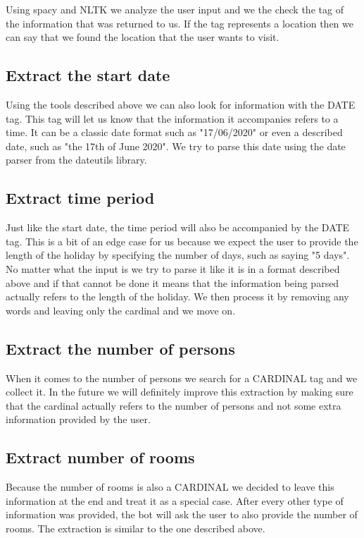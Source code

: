 \documentclass[runningheads,a4paper,11pt]{report}
\begin{document}
Using spacy and NLTK we analyze the user input and we the check the tag of the information that was returned to us. If the tag represents a location then we can say that we found the location that the user wants to visit.

\subsection{Extract the start date}
Using the tools described above we can also look for information with the DATE tag. This tag will let us know that the information it accompanies refers to a time. It can be a classic date format such as "17/06/2020" or even a described date, such as "the 17th of June 2020". We try to parse this date using the date parser from the dateutils library.

\subsection{Extract time period}
Just like the start date, the time period will also be accompanied by the DATE tag. This is a bit of an edge case for us because we expect the user to provide the length of the holiday by specifying the number of days, such as saying "5 days". No matter what the input is we try to parse it like it is in a format described above and if that cannot be done it means that the information being parsed actually refers to the length of the holiday. We then process it by removing any words and leaving only the cardinal and we move on.

\subsection{Extract the number of persons}
When it comes to the number of persons we search for a CARDINAL tag and we collect it. In the future we will definitely improve this extraction by making sure that the cardinal actually refers to the number of persons and not some extra information provided by the user.

\subsection{Extract number of rooms}
Because the number of rooms is also a CARDINAL we decided to leave this information at the end and treat it as a special case. After every other type of information was provided, the bot will ask the user to also provide the number of rooms. The extraction is similar to the one described above.
\end{document}

